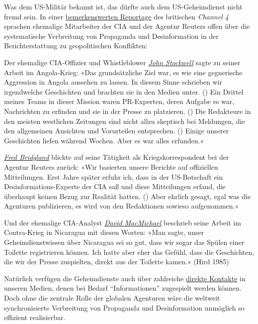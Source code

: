 Was dem US-Militär bekannt ist, das dürfte auch dem US-Geheimdienst
nicht fremd sein. In einer
\href{https://swprs.org/video-the-cia-and-the-media/}{bemerkenswerten
Reportage} des britischen \emph{Channel 4} sprachen ehemalige
Mitarbeiter der CIA und der Agentur Reuters offen über die systematische
Verbreitung von Propaganda und Desinformation in der Berichterstattung
zu geopolitischen Konflikten:

Der ehemalige CIA-Offizier und Whistleblower
\emph{\href{https://en.wikipedia.org/wiki/John_Stockwell}{John
Stockwell}} sagte zu seiner Arbeit im Angola-Krieg: »Das grundsätzliche
Ziel war, es wie eine gegnerische Aggression in Angola aussehen zu
lassen. In diesem Sinne schrieben wir irgendwelche Geschichten und
brachten sie in den Medien unter. () Ein Drittel meines Teams in dieser
Mission waren PR-Experten, deren Aufgabe es war, Nachrichten zu erfinden
und sie in der Presse zu platzieren. () Die Redakteure in den meisten
westlichen Zeitungen sind nicht allzu skeptisch bei Meldungen, die den
allgemeinen Ansichten und Vorurteilen entsprechen. () Einige unserer
Geschichten liefen während Wochen. Aber es war alles erfunden.«

\emph{\href{https://en.wikipedia.org/wiki/Fred_Bridgland}{Fred
Bridgland}} blickte auf seine Tätigkeit als Kriegs­korrespondent bei der
Agentur Reuters zurück: »Wir basierten unsere Berichte auf offiziellen
Mitteilungen. Erst Jahre später erfuhr ich, dass in der US-Botschaft ein
Desinformations-Experte der CIA saß und diese Mitteilungen erfand, die
überhaupt keinen Bezug zur Realität hatten. () Aber ehrlich gesagt, egal
was die Agenturen publizieren, es wird von den Redaktionen sowieso
aufgenommen.«

Und der ehemalige CIA-Analyst
\href{https://en.wikipedia.org/wiki/David_MacMichael}{\emph{David
MacMichael}} beschrieb seine Arbeit im Contra-Krieg in Nicaragua mit
diesen Worten: »Man sagte, unser Geheimdienstwissen über Nicaragua sei
so gut, dass wir sogar das Spülen einer Toilette registrieren können.
Ich hatte aber eher das Gefühl, dass die Geschichten, die wir der Presse
zuspielten, direkt aus der Toilette kamen.« (Hird 1985)

Natürlich verfügen die Geheimdienste auch über zahlreiche
\href{https://swprs.org/der-chefredakteur-und-die-cia/}{direkte
Kontakte} in unseren Medien, denen bei Bedarf ``Informationen''
zugespielt werden können. Doch ohne die zentrale Rolle der globalen
Agenturen wäre die weltweit synchronisierte Verbreitung von Propaganda
und Desinformation unmöglich so effizient realisierbar.

